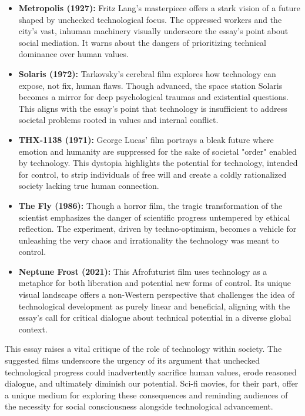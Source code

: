 \documentclass[11pt,fleqn]{book}
\begin{document}
\begin{itemize}
\item \textbf{Metropolis (1927):}  Fritz Lang's masterpiece offers a stark vision of a future shaped by unchecked technological focus.  The oppressed workers and the city's vast, inhuman machinery visually underscore the essay's point about social mediation. It warns about the dangers of prioritizing technical dominance over human values.

\item \textbf{Solaris (1972):}  Tarkovsky's cerebral film explores how technology can expose, not fix, human flaws. Though advanced, the space station Solaris becomes a mirror for deep psychological traumas and existential questions. This aligns with the essay's point that technology is insufficient to address societal problems rooted in values and internal conflict. 

\item \textbf{THX-1138 (1971):} George Lucas' film portrays a bleak future where emotion and humanity are suppressed for the sake of societal "order" enabled by technology. This dystopia highlights the potential for technology, intended for control, to strip individuals of free will and create a coldly rationalized society lacking true human connection. 

\item \textbf{The Fly (1986):}  Though a horror film, the tragic transformation of the scientist emphasizes the danger of scientific progress untempered by ethical reflection. The experiment, driven by techno-optimism, becomes a vehicle for unleashing the very chaos and irrationality the technology was meant to control.

\item \textbf{Neptune Frost (2021):}  This Afrofuturist film uses technology as a metaphor for both liberation and potential new forms of control. Its unique visual landscape offers a non-Western perspective that challenges the idea of technological development as purely linear and beneficial, aligning with the essay's call for critical dialogue about technical potential in a diverse global context. 
\end{itemize}

\vspace{5pt}

This essay raises a vital critique of the role of technology within society. The suggested films underscore the urgency of its argument that unchecked technological progress could inadvertently sacrifice human values, erode reasoned dialogue, and ultimately diminish our potential. Sci-fi movies, for their part, offer a unique medium for exploring these consequences and reminding audiences of the necessity for social consciousness alongside technological advancement. 
\end{document}
